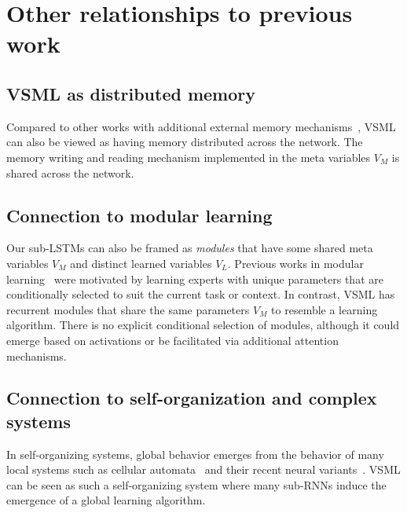 \documentclass{article}
\begin{document}
\section{Other relationships to previous work}\label{sec:relationships}

\subsection{VSML as distributed memory}

Compared to other works with additional external memory mechanisms~\citep{sun1991neural,mozer1993connectionist,Santoro,Mishra,schlag2021learning}, VSML can also be viewed as having memory distributed across the network.
The memory writing and reading mechanism implemented in the meta variables $V_M$ is shared across the network.

\subsection{Connection to modular learning}

Our sub-LSTMs can also be framed as \emph{modules} that have some shared meta variables $V_M$ and distinct learned variables $V_L$.
Previous works in modular learning~\citep{Shazeer2017,rosenbaum2018routing,Kirsch2018modular} were motivated by learning experts with unique parameters that are conditionally selected to suit the current task or context.
In contrast, VSML has recurrent modules that share the same parameters $V_M$ to resemble a learning algorithm.
There is no explicit conditional selection of modules, although it could emerge based on activations or be facilitated via additional attention mechanisms.

\subsection{Connection to self-organization and complex systems}
In self-organizing systems, global behavior emerges from the behavior of many local systems such as cellular automata~\citep{codd2014cellular} and their recent neural variants~\citep{mordvintsev2020growing,sudhakaran2021growing}.
VSML can be seen as such a self-organizing system where many sub-RNNs induce the emergence of a global learning algorithm.
\end{document}
